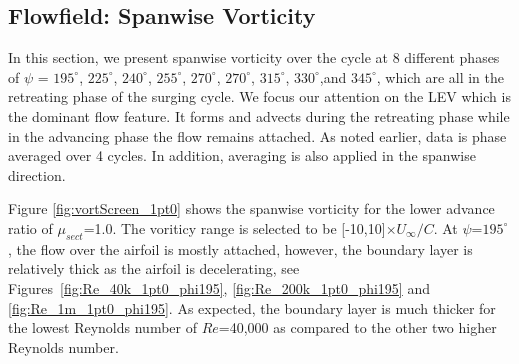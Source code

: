 \subsection{Flowfield: Spanwise Vorticity}

In this section, we present spanwise vorticity over the cycle at 8 different phases of $\psi$ = $195^\circ$, $225^\circ$, $240^\circ$, $255^\circ$, $270^\circ$, $270^\circ$, $315^\circ$, $330^\circ$,and $345^\circ$, which are all in the retreating phase of the surging cycle.
We focus our attention on the LEV which is the dominant flow feature.
It forms and advects during the retreating phase while in the advancing phase the flow remains attached.
As noted earlier, data is phase averaged over 4 cycles.
In addition, averaging is also applied in the spanwise direction.

Figure \ref{fig:vortScreen_1pt0} shows the spanwise vorticity for the lower advance ratio of $\mu_{sect}$=1.0.
The voriticy range is selected to be [-10,10]$\times U_\infty /C$.
At $\psi$=$195^\circ$, the flow over the airfoil is mostly attached, however, the boundary layer is relatively thick as the airfoil is decelerating, see Figures~\ref{fig:Re_40k_1pt0_phi195}, \ref{fig:Re_200k_1pt0_phi195} and \ref{fig:Re_1m_1pt0_phi195}.
As expected, the boundary layer is much thicker for the lowest Reynolds number of $Re$=40,000 as compared to the other two higher Reynolds number.

